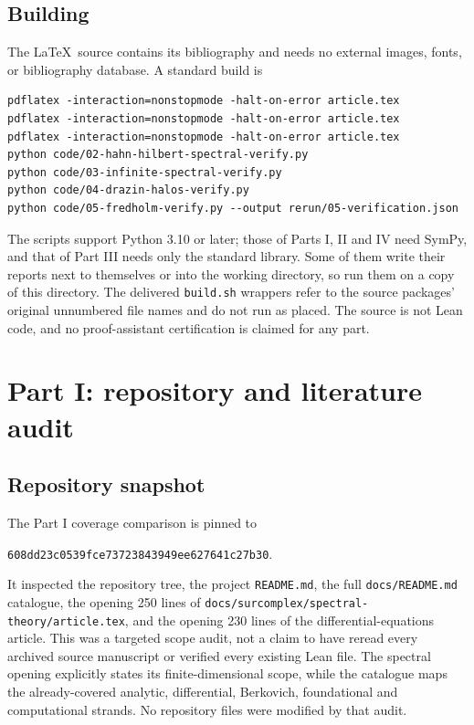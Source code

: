 \documentclass[11pt,a4paper]{article}
\numberwithin{equation}{section}
\theoremstyle{definition}
\theoremstyle{remark}
\newcommand{\commitA}{608dd23c0539fce73723843949ee627641c27b30}
\begin{document}
\subsection{Building}\label{ihs:sec:building}
The \LaTeX\ source contains its bibliography and needs no external images,
fonts, or bibliography database. A standard build is
\begin{verbatim}
pdflatex -interaction=nonstopmode -halt-on-error article.tex
pdflatex -interaction=nonstopmode -halt-on-error article.tex
pdflatex -interaction=nonstopmode -halt-on-error article.tex
python code/02-hahn-hilbert-spectral-verify.py
python code/03-infinite-spectral-verify.py
python code/04-drazin-halos-verify.py
python code/05-fredholm-verify.py --output rerun/05-verification.json
\end{verbatim}
The scripts support Python 3.10 or later; those of Parts I, II and IV need
SymPy, and that of Part III needs only the standard library. Some of them
write their reports next to themselves or into the working directory, so run
them on a copy of this directory. The delivered \texttt{build.sh} wrappers
refer to the source packages' original unnumbered file names and do not run
as placed. The source is not Lean code, and no proof-assistant certification
is claimed for any part.

\appendix
\section{Part I: repository and literature audit}\label{ihs:app:auditA}

\subsection{Repository snapshot}\label{ihs:app:snapshotA}
The Part I coverage comparison is pinned to
\begin{center}\small\texttt{\commitA}.\end{center}
It inspected the repository tree, the project \texttt{README.md}, the full
\texttt{docs/README.md} catalogue, the opening 250 lines of
\texttt{docs/surcomplex/spectral-theory/article.tex}, and the opening 230
lines of the differential-equations article. This was a targeted scope
audit, not a claim to have reread every archived source manuscript or
verified every existing Lean file. The spectral opening explicitly states
its finite-dimensional scope, while the catalogue maps the already-covered
analytic, differential, Berkovich, foundational and computational strands.
No repository files were modified by that audit.
\end{document}
